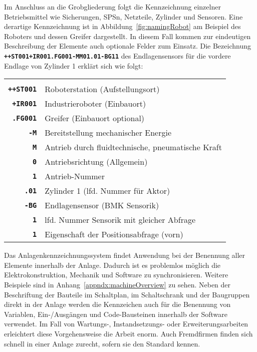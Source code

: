 Im Anschluss an die Grobgliederung folgt die Kennzeichnung einzelner Betriebsmittel wie Sicherungen, SPSn, Netzteile, Zylinder und Sensoren. Eine derartige Kennzeichnung ist in Abbildung~\ref{fig:namingRobot} am Beispiel des Roboters und dessen Greifer dargestellt. In diesem Fall kommen zur eindeutigen Beschreibung der Elemente auch optionale Felder zum Einsatz. Die Bezeichnung \texttt{\textbf{++ST001+IR001.FG001-MM01.01-BG11}} des Endlagensensors für die vordere Endlage von Zylinder 1 erklärt sich wie folgt:


\begin{tabularx}{0.92\textwidth}{rX}
  & \\
  \textbf{\texttt{++ST001}} & Roboterstation (Aufstellungsort)\\
  \textbf{\texttt{+IR001}} & Industrieroboter (Einbauort)\\
  \textbf{\texttt{.FG001}} & Greifer (Einbauort optional)\\
  \textbf{\texttt{-M}} & Bereitstellung mechanischer Energie\\
  \textbf{\texttt{M}} & Antrieb durch fluidtechnische, pneumatische Kraft\\
  \textbf{\texttt{0}} & Antriebsrichtung (Allgemein)\\
  \textbf{\texttt{1}} & Antrieb-Nummer\\
  \textbf{\texttt{.01}} & Zylinder 1 (lfd. Nummer für Aktor)\\
  \textbf{\texttt{-BG}} & Endlagensensor (BMK Sensorik)\\
  \textbf{\texttt{1}} & lfd. Nummer Sensorik mit gleicher Abfrage\\
  \textbf{\texttt{1}} & Eigenschaft der Positionsabfrage (vorn)
\end{tabularx}

\leer Das Anlagenkennzeichnungssystem findet Anwendung bei der Benennung aller Elemente innerhalb der Anlage. Dadurch ist es problemlos möglich die Elektrokonstruktion, Mechanik und Software zu synchronisieren. Weitere Beispiele sind in Anhang~\ref{appndx:machineOverview} zu sehen. Neben der Beschriftung der Bauteile im Schaltplan, im Schaltschrank und der Baugruppen direkt in der Anlage werden die Kennzeichen auch für die Benennung von Variablen, Ein-/Ausgängen und Code-Bausteinen innerhalb der Software verwendet. Im Fall von Wartungs-, Instandsetzungs- oder Erweiterungsarbeiten erleichtert diese Vorgehensweise die Arbeit enorm. Auch Fremdfirmen finden sich schnell in einer Anlage zurecht, sofern sie den Standard kennen.